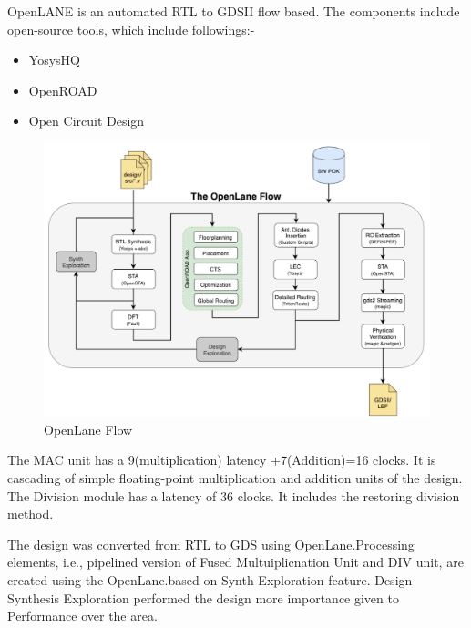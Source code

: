OpenLANE\cite{OpenLane} is an automated RTL to GDSII flow based. The components include open-source tools, which include followings:-
\begin{itemize}
  \itemsep0em 
    \item YosysHQ
    \item OpenROAD
    \item Open Circuit Design
\end{itemize}
\begin{figure}[h]
    \centering
    \includegraphics[width = 0.8\linewidth]{./ASIC/openlane_flow.png}
    \caption{OpenLane Flow}
\end{figure}

The MAC unit has a 9(multiplication) latency +7(Addition)=16 clocks. It is 
cascading of simple floating-point multiplication and addition units of the design. The Division module has a latency of 36 clocks. It includes the restoring division method.

The design was converted from RTL to GDS using OpenLane.Processing elements, i.e., pipelined version of Fused Multuiplicnation Unit and DIV unit, are created using the OpenLane.based on Synth Exploration feature. Design Synthesis Exploration performed the design more importance given to Performance over the area. 

